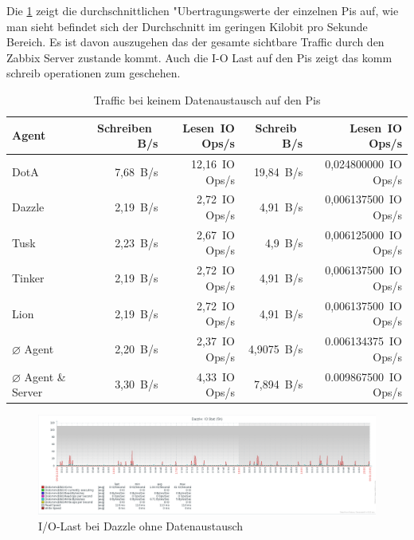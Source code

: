 Die \cref{tab:noTraffic} zeigt die durchschnittlichen "Ubertragungswerte der einzelnen Pis auf, wie man sieht %
befindet sich der Durchschnitt im geringen Kilobit pro Sekunde Bereich. Es ist davon auszugehen das der gesamte %
sichtbare Traffic durch den Zabbix Server zustande kommt. Auch die I-O Last auf den Pis zeigt das komm schreib operationen %
zum geschehen.  

\begin{table}
\centering
\begin{tabular}{l%
 r<{\,B/s}%
 r<{\,IO Ops/s}%
 r<{\,B/s}%
 r<{\,IO Ops/s}%
}
Agent	  			& Schreiben		& Lesen 		& Schreib		& Lesen			\\
\hline
DotA				& 7,68			& 12,16			& 19,84			& 0,024800000 		\\
Dazzle 				& 2,19	 		& 2,72			& 4,91			& 0,006137500 		\\
Tusk 				& 2,23			& 2,67			& 4,9			& 0,006125000		\\
Tinker				& 2,19	 		& 2,72	 		& 4,91	 		& 0,006137500		\\
Lion				& 2,19	 		& 2,72	 		& 4,91  		& 0,006137500		\\
$\diameter $ Agent 		& 2,20			& 2,37			& 4,9075		& 0.006134375		\\   
$\diameter $ Agent \& Server 	& 3,30  		& 4,33			& 7,894			& 0.009867500		\\
\end{tabular}
\caption{Traffic bei keinem Datenaustausch auf den Pis}
\label{tab:noTraffic}
\end{table}


\begin{figure}[htbp]
\centering
\includegraphics*[width=0.9\linewidth]{Abb/ZabbixDazzle/NoTraffic/DazzleNoTrafficIoStat}

\caption{I/O-Last bei Dazzle ohne Datenaustausch}
\label{fig:Eth0ServerNoTraffic}
\end{figure}


